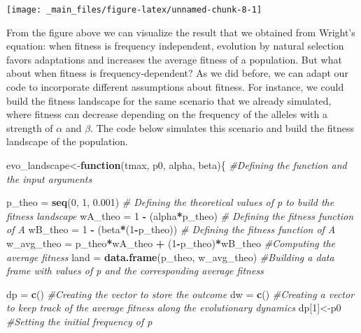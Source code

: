 \documentclass[
]{book}
\newenvironment{Shaded}{\begin{snugshade}}{\end{snugshade}}
\newcommand{\CommentTok}[1]{\textcolor[rgb]{0.56,0.35,0.01}{\textit{#1}}}
\newcommand{\ControlFlowTok}[1]{\textcolor[rgb]{0.13,0.29,0.53}{\textbf{#1}}}
\newcommand{\DecValTok}[1]{\textcolor[rgb]{0.00,0.00,0.81}{#1}}
\newcommand{\FloatTok}[1]{\textcolor[rgb]{0.00,0.00,0.81}{#1}}
\newcommand{\FunctionTok}[1]{\textcolor[rgb]{0.13,0.29,0.53}{\textbf{#1}}}
\newcommand{\NormalTok}[1]{#1}
\newcommand{\OtherTok}[1]{\textcolor[rgb]{0.56,0.35,0.01}{#1}}
\newcommand{\SpecialCharTok}[1]{\textcolor[rgb]{0.81,0.36,0.00}{\textbf{#1}}}
\begin{document}
\texttt{[image: \_main\_files/figure-latex/unnamed-chunk-8-1]}

From the figure above we can visualize the result that we obtained from Wright's equation: when fitness is frequency independent, evolution by natural selection favors adaptations and increases the average fitness of a population. But what about when fitness is frequency-dependent? As we did before, we can adapt our code to incorporate different assumptions about fitness. For instance, we could build the fitness landscape for the same scenario that we already simulated, where fitness can decrease depending on the frequency of the alleles with a strength of \(\alpha\) and \(\beta\). The code below simulates this scenario and build the fitness landscape of the population.

\begin{Shaded}
\begin{Highlighting}[]
\NormalTok{evo\_landscape}\OtherTok{\textless{}{-}}\ControlFlowTok{function}\NormalTok{(tmax, p0, alpha, beta)\{ }\CommentTok{\#Defining the function and the input arguments}
  
\NormalTok{p\_theo }\OtherTok{=} \FunctionTok{seq}\NormalTok{(}\DecValTok{0}\NormalTok{, }\DecValTok{1}\NormalTok{, }\FloatTok{0.001}\NormalTok{) }\CommentTok{\# Defining the theoretical values of p to build the fitness landscape}
\NormalTok{wA\_theo }\OtherTok{=} \DecValTok{1} \SpecialCharTok{{-}}\NormalTok{ (alpha}\SpecialCharTok{*}\NormalTok{p\_theo) }\CommentTok{\# Defining the fitness function of A}
\NormalTok{wB\_theo }\OtherTok{=} \DecValTok{1} \SpecialCharTok{{-}}\NormalTok{ (beta}\SpecialCharTok{*}\NormalTok{(}\DecValTok{1}\SpecialCharTok{{-}}\NormalTok{p\_theo)) }\CommentTok{\# Defining the fitness function of A}
\NormalTok{w\_avg\_theo }\OtherTok{=}\NormalTok{ p\_theo}\SpecialCharTok{*}\NormalTok{wA\_theo }\SpecialCharTok{+}\NormalTok{ (}\DecValTok{1}\SpecialCharTok{{-}}\NormalTok{p\_theo)}\SpecialCharTok{*}\NormalTok{wB\_theo }\CommentTok{\#Computing the average fitness}
\NormalTok{land }\OtherTok{=} \FunctionTok{data.frame}\NormalTok{(p\_theo, w\_avg\_theo) }\CommentTok{\#Building a data frame with values of p and the corresponding average fitness}
  
\NormalTok{dp }\OtherTok{=} \FunctionTok{c}\NormalTok{() }\CommentTok{\#Creating the vector to store the outcome}
\NormalTok{dw }\OtherTok{=} \FunctionTok{c}\NormalTok{() }\CommentTok{\#Creating a vector to keep track of the average fitness along the evolutionary dynamics}
\NormalTok{dp[}\DecValTok{1}\NormalTok{]}\OtherTok{\textless{}{-}}\NormalTok{p0 }\CommentTok{\#Setting the initial frequency of p}
  

\end{Highlighting}
\end{Shaded}
\end{document}
